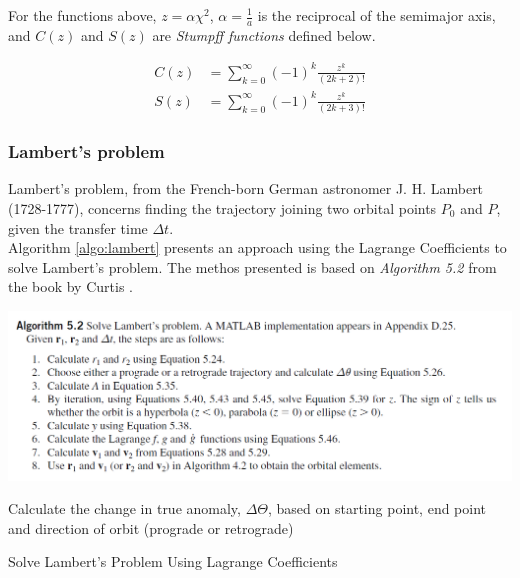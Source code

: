 For the functions above, $z = \alpha \chi^2$, $\alpha = \frac{1}{a}$ is the reciprocal of the semimajor axis, and $C(z)$ and $S(z)$ are \textit{Stumpff functions} defined below.

\begin{align}
    C(z) &= \sum_{k = 0}^{\infty} (-1)^k \frac{z^k}{(2k + 2)!} \\
    S(z) &= \sum_{k = 0}^{\infty} (-1)^k \frac{z^k}{(2k + 3)!}
\end{align}{}




\subsubsection{Lambert's problem}

Lambert's problem, from the French-born German astronomer J. H. Lambert (1728-1777), concerns finding the trajectory joining two orbital points $P_0$ and $P$, given the transfer time $\Delta t$.  \\

Algorithm \ref{algo:lambert} presents an approach using the Lagrange Coefficients to solve Lambert's problem. The methos presented is based on \textit{Algorithm 5.2} from the book by Curtis \cite{Curtis2009}.

\includegraphics[width=\textwidth]{Images/Alg52.PNG}

\begin{algorithm}
    \DontPrintSemicolon
    Calculate the change in true anomaly, $\mathit{\Delta\Theta}$, based on starting point, end point and direction of orbit (prograde or retrograde)\;
    \;
    \caption{Solve Lambert's Problem Using Lagrange Coefficients}
    \label{algo:lambert}
\end{algorithm}




